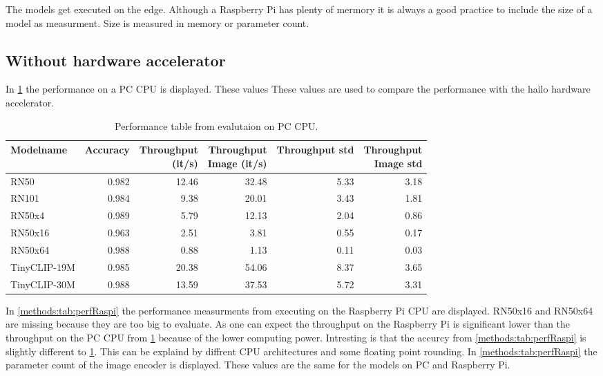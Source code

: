 The models get executed on the edge.
Although a Raspberry Pi has plenty of mermory it is always a good practice to include the size of a model as measurment.
Size is measured in memory or parameter count.

\subsection{Without hardware accelerator}
In \cref{methods:tab:perfPC} the performance on a PC CPU is displayed.
These values 
These values are used to compare the performance with the hailo hardware accelerator.

\begin{table}[]
    \centering
    \begin{tabular}{l|rrrrr}
    \hline
        Modelname & Accuracy & \makecell{Throughput\\(it/s)} & \makecell{Throughput \\ Image (it/s)} & Throughput std & \makecell{Throughput\\Image std} \\ \hline
        RN50 & 0.982 & 12.46 & 32.48 & 5.33 & 3.18 \\ 
        RN101 & 0.984 & 9.38 & 20.01 & 3.43 & 1.81 \\ 
        RN50x4 & 0.989 & 5.79 & 12.13 & 2.04 & 0.86 \\ 
        RN50x16 & 0.963 & 2.51 & 3.81 & 0.55 & 0.17 \\ 
        RN50x64 & 0.988 & 0.88 & 1.13 & 0.11 & 0.03 \\ 
        TinyCLIP-19M & 0.985 & 20.38 & 54.06 & 8.37 & 3.65 \\ 
        TinyCLIP-30M & 0.988 & 13.59 & 37.53 & 5.72 & 3.31 \\ 
    \end{tabular}
    \caption{Performance table from evalutaion on PC CPU.}
    \label{methods:tab:perfPC}
\end{table}

In \cref{methods:tab:perfRaspi} the performance measurments from executing on the Raspberry Pi CPU are displayed.
RN50x16 and RN50x64 are missing because they are too big to evaluate.
As one can expect the throughput on the Raspberry Pi is significant lower than the throughput on the PC CPU from \cref{methods:tab:perfPC} because of the lower computing power.
Intresting is that the accurcy from \cref{methods:tab:perfRaspi} is slightly different to \cref{methods:tab:perfPC}.
This can be explaind by diffrent CPU architectures and some floating point rounding.
In \cref{methods:tab:perfRaspi} the parameter count of the image encoder is displayed. These values are the same for the models on PC and Raspberry Pi.

